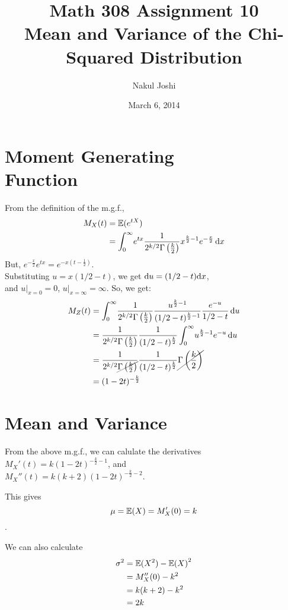 \documentclass[twocolumn]{article}
\title{Math 308 Assignment 10\\Mean and Variance of the Chi-Squared Distribution}
\author{Nakul Joshi}
\date{March 6, 2014}
\newcommand{\hk}{\frac{k}{2}}
\newcommand{\ga}{\Gamma\left(\hk\right)}
\begin{document}
\maketitle

\section{Moment Generating \\ Function}
From the definition of the m.g.f., \begin{align*}
M_X(t)&=\ev{e^{tX}}\\
&=\intg{0}{\infty}{
	e^{tx} \frac{1}{2^{k/2}\ga} x^{\hk-1} e^{-\frac{x}{2}}
}{x}\\
\end{align*}
But, $e^{-\frac{x}{2}}e^{tx}= e^{-x(t-\frac{1}{2})}$.\\
Substituting $u=x(1/2-t)$, we get $\mathrm{d} u= (1/2-t)\mathrm{d} x$,\\
and $u|_{x=0}=0$, $u|_{x=\infty}=\infty$.
So, we get:\begin{align*}
M_Z(t)
&=\intg{0}{\infty}{
	\frac{1}{2^{k/2} \ga} \frac{u^{\hk-1}}{(1/2-t)^{\hk-1}} \frac{e^{-u}}{1/2-t}
}{u}\\
&=\frac{1}{2^{k/2} \ga} \frac{1}{(1/2-t)^{\hk}} \intg{0}{\infty}{
	u^{\hk-1} e^{-u}
}{u}\\
&= \frac{1}{2^{k/2} \cancel{\ga}} \frac{1}{(1/2-t)^{\hk}} \cancel{\ga} \\
&= (1-2t)^{-\hk}
\end{align*}

\newpage

\section{Mean and Variance}

From the above m.g.f., we can calulate the derivatives\\
$M_X'(t)=k(1-2t)^{-\hk-1}$, and\\ $M_X''(t)=k(k+2)(1-2t)^{-\hk-2}$.

This gives \[\mu= \mathbb{E}(X)= M_X'(0)=k\].

We can also calculate\begin{align*}
\sigma^2&=\mathbb{E}(X^2)-{\mathbb{E}(X)}^2\\
&=M_X''(0)-k^2\\
&=k(k+2)-k^2\\
&=2k
\end{align*}
\end{document}

